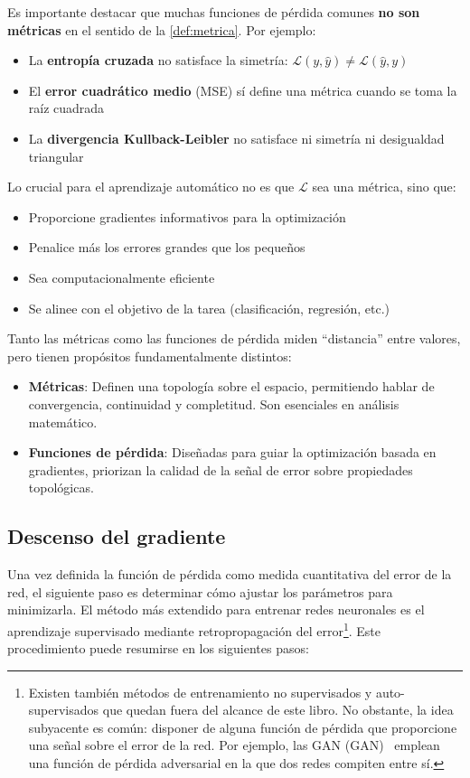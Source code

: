 Es importante destacar que muchas funciones de pérdida comunes \textbf{no son métricas} en el sentido de la \autoref{def:metrica}. Por ejemplo:
\begin{itemize}
	\item La \textbf{entropía cruzada} no satisface la simetría: \(\mathcal{L}(y, \hat{y}) \neq \mathcal{L}(\hat{y}, y)\)
	\item El \textbf{error cuadrático medio} (MSE) sí define una métrica cuando se toma la raíz cuadrada
	\item La \textbf{divergencia Kullback-Leibler} no satisface ni simetría ni desigualdad triangular
\end{itemize}

Lo crucial para el aprendizaje automático no es que \(\mathcal{L}\) sea una métrica, sino que:
\begin{itemize}
	\item Proporcione gradientes informativos para la optimización
	\item Penalice más los errores grandes que los pequeños
	\item Sea computacionalmente eficiente
	\item Se alinee con el objetivo de la tarea (clasificación, regresión, etc.)
\end{itemize}

Tanto las métricas como las funciones de pérdida miden ``distancia'' entre valores, pero tienen propósitos fundamentalmente distintos:
\begin{itemize}
	\item \textbf{Métricas}: Definen una topología sobre el espacio, permitiendo hablar de convergencia, continuidad y completitud. Son esenciales en análisis matemático.
	\item \textbf{Funciones de pérdida}: Diseñadas para guiar la optimización basada en gradientes, priorizan la calidad de la señal de error sobre propiedades topológicas.
\end{itemize}

\subsection{Descenso del gradiente}\label{subsec:descenso_gradiente}

Una vez definida la función de pérdida como medida cuantitativa del error de la red, el siguiente paso es determinar cómo ajustar los parámetros para minimizarla. El método más extendido para entrenar redes neuronales es el aprendizaje supervisado mediante retropropagación del error\footnote{Existen también métodos de entrenamiento no supervisados y auto-supervisados que quedan fuera del alcance de este libro. No obstante, la idea subyacente es común: disponer de alguna función de pérdida que proporcione una señal sobre el error de la red. Por ejemplo, las \acrlong{GAN} (\gls{GAN})~\citep{goodfellow2014generative} emplean una función de pérdida adversarial en la que dos redes compiten entre sí.}. Este procedimiento puede resumirse en los siguientes pasos:

